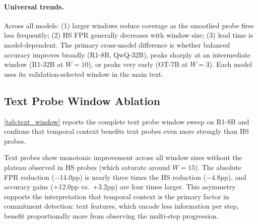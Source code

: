 \paragraph{Universal trends.} Across all models: (1) larger windows reduce coverage as the smoothed probe fires less frequently; (2) HS FPR generally decreases with window size; (3) lead time is model-dependent. The primary cross-model difference is whether balanced accuracy improves broadly (R1-8B, QwQ-32B), peaks sharply at an intermediate window (R1-32B at $W{=}10$), or peaks very early (OT-7B at $W{=}3$). Each model uses its validation-selected window in the main text.

\subsection{Text Probe Window Ablation}
\label{app:text_window}

\cref{tab:text_window} reports the complete text probe window sweep on R1-8B and confirms that temporal context benefits text probes even more strongly than HS probes.

\begin{table}[htbp]
\centering
\caption{Text probe window ablation on R1-8B (step-level metrics). Text probes gain +12.0pp accuracy from $W{=}1$ to $W{=}25$, compared to +3.2pp for HS probes over the same range. The larger marginal gain for text probes reflects their weaker single-step baseline.}
\label{tab:text_window}
\end{table}

Text probes show monotonic improvement across all window sizes without the plateau observed in HS probes (which saturate around $W{=}15$). The absolute FPR reduction ($-$14.0pp) is nearly three times the HS reduction ($-$4.8pp), and accuracy gains (+12.0pp vs.\ +3.2pp) are four times larger. This asymmetry supports the interpretation that temporal context is the primary factor in commitment detection: text features, which encode less information per step, benefit proportionally more from observing the multi-step progression.


